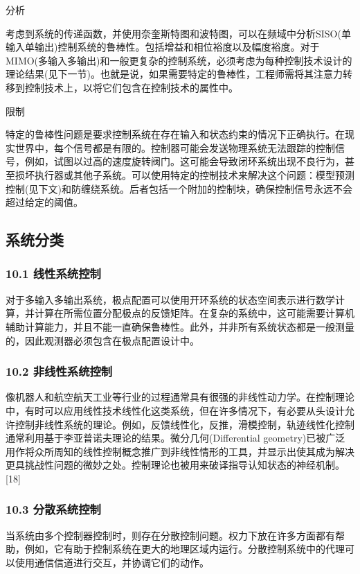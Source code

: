 分析

考虑到系统的传递函数，并使用奈奎斯特图和波特图，可以在频域中分析SISO(单输入单输出)控制系统的鲁棒性。包括增益和相位裕度以及幅度裕度。对于MIMO(多输入多输出)和一般更复杂的控制系统，必须考虑为每种控制技术设计的理论结果(见下一节)。也就是说，如果需要特定的鲁棒性，工程师需将其注意力转移到控制技术上，以将它们包含在控制技术的属性中。

限制

特定的鲁棒性问题是要求控制系统在存在输入和状态约束的情况下正确执行。在现实世界中，每个信号都是有限的。控制器可能会发送物理系统无法跟踪的控制信号，例如，试图以过高的速度旋转阀门。这可能会导致闭环系统出现不良行为，甚至损坏执行器或其他子系统。可以使用特定的控制技术来解决这个问题：模型预测控制(见下文)和防缠绕系统。后者包括一个附加的控制块，确保控制信号永远不会超过给定的阈值。

\subsection{系统分类}

\subsubsection{10.1 线性系统控制}

对于多输入多输出系统，极点配置可以使用开环系统的状态空间表示进行数学计算，并计算在所需位置分配极点的反馈矩阵。在复杂的系统中，这可能需要计算机辅助计算能力，并且不能一直确保鲁棒性。此外，并非所有系统状态都是一般测量的，因此观测器必须包含在极点配置设计中。

\subsubsection{10.2 非线性系统控制}

像机器人和航空航天工业等行业的过程通常具有很强的非线性动力学。在控制理论中，有时可以应用线性技术线性化这类系统，但在许多情况下，有必要从头设计允许控制非线性系统的理论。例如，反馈线性化，反推，滑模控制，轨迹线性化控制通常利用基于李亚普诺夫理论的结果。微分几何(Differential geometry)已被广泛用作将众所周知的线性控制概念推广到非线性情形的工具，并显示出使其成为解决更具挑战性问题的微妙之处。控制理论也被用来破译指导认知状态的神经机制。[18]

\subsubsection{10.3 分散系统控制}

当系统由多个控制器控制时，则存在分散控制问题。权力下放在许多方面都有帮助，例如，它有助于控制系统在更大的地理区域内运行。分散控制系统中的代理可以使用通信信道进行交互，并协调它们的动作。

